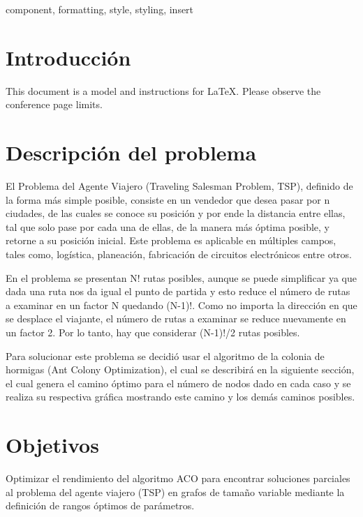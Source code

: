 \documentclass[conference]{IEEEtran}
\begin{document}
\begin{abstract}
This document is a model and instructions for \LaTeX.
This and the IEEEtran.cls file define the components of your paper [title, text, heads, etc.]. *CRITICAL: Do Not Use Symbols, Special Characters, Footnotes, 
or Math in Paper Title or Abstract.
\end{abstract}

\begin{IEEEkeywords}
component, formatting, style, styling, insert
\end{IEEEkeywords}

\section{Introducción}
This document is a model and instructions for \LaTeX.
Please observe the conference page limits. 

\section{Descripción del problema}

El Problema del Agente Viajero (Traveling Salesman Problem, TSP), definido de la forma más simple posible, consiste en un vendedor que desea pasar por n ciudades, de las cuales se conoce su posición y por ende la distancia entre ellas, tal que solo pase por cada una de ellas, de la manera más óptima posible, y retorne a su posición inicial. Este problema es aplicable en múltiples campos, tales como, logística, planeación, fabricación de circuitos electrónicos entre otros.

 En el problema se presentan N! rutas posibles, aunque se puede simplificar ya que dada una ruta nos da igual el punto de partida y esto reduce el número de rutas a examinar en un factor N quedando (N-1)!. Como no importa la dirección en que se desplace el viajante, el número de rutas a examinar se reduce nuevamente en un factor 2. Por lo tanto, hay que considerar (N-1)!/2 rutas posibles.

 Para solucionar este problema se decidió usar el algoritmo de la colonia de hormigas (Ant Colony Optimization), el cual se describirá en la siguiente sección, el cual genera el camino óptimo para el número de nodos dado en cada caso y se realiza su respectiva gráfica mostrando este camino y los demás caminos posibles. 

\section {Objetivos}
Optimizar el rendimiento del algoritmo ACO para encontrar soluciones parciales al problema del agente viajero (TSP) en grafos de tamaño variable mediante la definición de rangos óptimos de parámetros.
\end{document}
